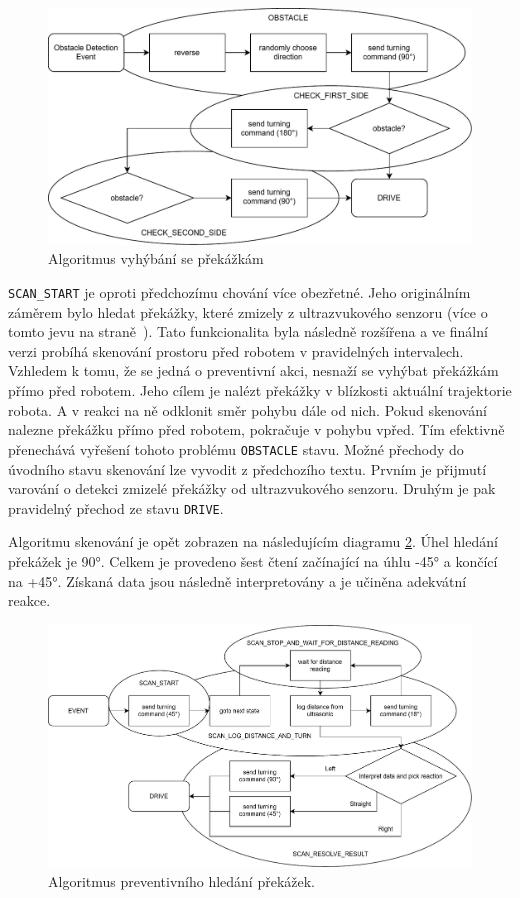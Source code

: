 \begin{figure}[h!]
	\centering
	\includegraphics[scale=0.75]{obrazky-figures/wandering_obstacle_diagram.pdf}
	\caption{Algoritmus vyhýbání se překážkám}
	\label{fig:alg_obstacle}
\end{figure}

\verb|SCAN_START| je oproti předchozímu chování více obezřetné. Jeho originálním záměrem bylo hledat překážky, které zmizely z ultrazvukového senzoru (více o tomto jevu na straně~\pageref{implementation:ultrasonic}). Tato funkcionalita byla následně rozšířena a ve finální verzi probíhá skenování prostoru před robotem v pravidelných intervalech. Vzhledem k tomu, že se jedná o preventivní akci, nesnaží se vyhýbat překážkám přímo před robotem. Jeho cílem je nalézt překážky v blízkosti aktuální trajektorie robota. A v reakci na ně odklonit směr pohybu dále od nich. Pokud skenování nalezne překážku přímo před robotem, pokračuje v pohybu vpřed. Tím efektivně přenechává vyřešení tohoto problému \verb|OBSTACLE| stavu. Možné přechody do úvodního stavu skenování lze vyvodit z předchozího textu. Prvním je přijmutí varování o detekci zmizelé překážky od ultrazvukového senzoru. Druhým je pak pravidelný přechod ze stavu \verb|DRIVE|.

Algoritmu skenování je opět zobrazen na následujícím diagramu \ref{fig:alg_scan}. Úhel hledání překážek je 90°. Celkem je provedeno šest čtení začínající na úhlu -45° a končící na +45°. Získaná data jsou následně interpretovány a je učiněna adekvátní reakce.

\begin{figure}[h!]
	\centering
	\includegraphics[scale=0.65]{obrazky-figures/wandering_scan_diagram.pdf}
	\caption{Algoritmus preventivního hledání překážek.}
	\label{fig:alg_scan}
\end{figure}

